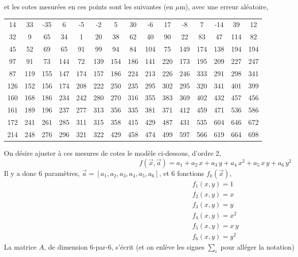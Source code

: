 et les cotes mesurées en ces points sont les suivantes (en $\mu$m), avec une erreur aléatoire,
\begin{center}
    \begin{tabular}{ccccccccccccccc}
        14  & 33  & -35 & 6   & -5  & -2  & 5   & 30  & -6  & 17  & -8  & 7   & -14 & 39  & 12  \\
        32  & 9   & 65  & 34  & 1   & 20  & 38  & 62  & 40  & 90  & 22  & 83  & 47  & 114 & 82  \\
        45  & 52  & 69  & 65  & 91  & 99  & 94  & 84  & 104 & 75  & 149 & 174 & 138 & 194 & 194 \\
        97  & 91  & 73  & 144 & 72  & 139 & 154 & 186 & 141 & 220 & 173 & 195 & 209 & 227 & 247 \\
        87  & 119 & 155 & 147 & 174 & 157 & 186 & 224 & 213 & 226 & 246 & 333 & 291 & 298 & 341 \\
        126 & 152 & 156 & 174 & 208 & 222 & 250 & 235 & 295 & 302 & 295 & 320 & 341 & 401 & 399 \\
        160 & 168 & 186 & 234 & 242 & 280 & 270 & 316 & 355 & 383 & 369 & 402 & 432 & 457 & 456 \\
        161 & 189 & 196 & 237 & 277 & 313 & 356 & 335 & 381 & 371 & 412 & 459 & 471 & 536 & 586 \\
        172 & 241 & 261 & 285 & 311 & 315 & 358 & 415 & 429 & 487 & 431 & 535 & 604 & 646 & 672 \\
        214 & 248 & 276 & 296 & 321 & 322 & 429 & 458 & 474 & 499 & 597 & 566 & 619 & 664 & 698
    \end{tabular}
\end{center}
On désire ajuster à ces mesures de cotes le modèle ci-dessous, d'ordre 2,
\begin{equation}
    f(\vec{x},\vec{a})=a_1+a_2\,x+a_3\,y+a_4\,x^2+a_5\,x\,y+a_6\,y^2
\end{equation}
Il y a donc 6 paramètres, $\vec{a}=[a_1,a_2,a_3,a_4,a_5,a_6]$, et 6 fonctions $f_k(\vec{x})$,
\begin{gather}
    f_1(x,y)=1\\
    f_2(x,y)=x\\
    f_3(x,y)=y\\
    f_4(x,y)=x^2\\
    f_5(x,y)=x\,y\\
    f_6(x,y)=y^2
\end{gather}
La matrice $A$, de dimension 6-par-6, s'écrit (et on enlève les signes $\sum_i$ pour alléger la notation)
